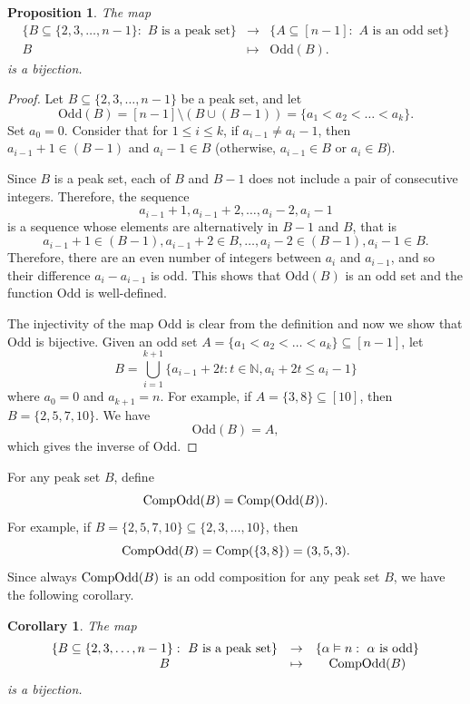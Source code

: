 \documentclass[11pt]{amsart}
\newtheorem{Corollary}[Theorem]{Corollary}
\newtheorem{Proposition}[Theorem]{Proposition}
\numberwithin{equation}{section}
\newcommand{\odd}{\mathrm{Odd}}
\begin{document}
\begin{Proposition}\label{Pro:oddbij}
The map $$\begin{array}{cccc}
  \{B\subseteq \{2,3,\dots, n-1\}: \text{~$B$ is a peak set}\}& \rightarrow & \{A\subseteq [n-1]: \text{~$A$ is an odd set}\}\\
 B & \mapsto & \odd(B).
\end{array}$$
 is a bijection.
\end{Proposition}

\begin{proof}
Let $B\subseteq\{2,3,\dots, n-1\}$ be a peak set, and let 
$$\odd(B)=[n-1]\setminus (B\cup (B-1))=\{a_1<a_2<\dots<a_k\}.$$ Set $a_0=0$. Consider that for $1\leq i\leq k$, if $a_{i-1}\neq a_i-1$, then  $a_{i-1}+1 \in (B-1)$ and $a_{i}-1\in B$ (otherwise, $a_{i-1}\in B$ or $a_{i}\in B$).

 Since $B$ is a peak set, each of $B$ and $B-1$ does not include a pair of consecutive integers. Therefore, the sequence 
 $$a_{i-1}+1,a_{i-1}+2, \ldots, a_{i}-2,a_{i}-1$$
 is a sequence whose elements are alternatively in $B-1$ and $B$, that is 
 $$a_{i-1}+1\in (B-1),a_{i-1}+2\in B, \ldots, a_{i}-2\in (B-1) ,a_{i}-1\in B.$$
 Therefore, there are an even number of integers between $a_i$ and $a_{i-1}$, and so their difference $a_{i}-a_{i-1}$ is odd. This shows that  $\odd(B)$ is an odd set and the function $\odd$ is well-defined. 
 
 
 The injectivity of the map $\odd$ is clear from the definition and now we show that $\odd$ is bijective. Given an odd set $A=\{a_1<a_2<\dots<a_k\}\subseteq [n-1]$, let
 \[B=\bigcup_{i=1}^{k+1}\{a_{i-1}+2t:t\in \mathbb{N}, a_{i}+2t\leq a_{i}-1\}\] where $a_0=0$ and $a_{k+1}=n.$ For example, if $A=\{3,8\}\subseteq [10]$, then $B=\{2,5,7,10\}.$
% 
% 
We have
 $$\odd(B)=A,$$
 which gives the inverse of $\odd$.
\end{proof} 

For any peak set $B$, define 
\[{\rm CompOdd}(B)={\rm Comp}({\rm Odd}(B)).\]
For example, if $B=\{2,5,7, 10\}\subseteq \{2,3,\dots,10\}$, then 
\[{\rm CompOdd}(B)={\rm Comp}(\{3,8\})=(3,5,3).\] 
Since always ${\rm CompOdd}(B)$ is an odd composition for any peak set $B$, we have the following corollary.
\begin{Corollary} 
The map 
$$\begin{array}{cccc}
  \{B\subseteq \{2,3,\dots, n-1\}: \text{~$B$ is a peak set}\}& \rightarrow & \{\alpha\vDash n: \text{~$\alpha$ is odd}\}\\
 B & \mapsto & {\rm Comp}\odd(B)
\end{array}$$
is a bijection.
\end{Corollary} 
\end{document}
